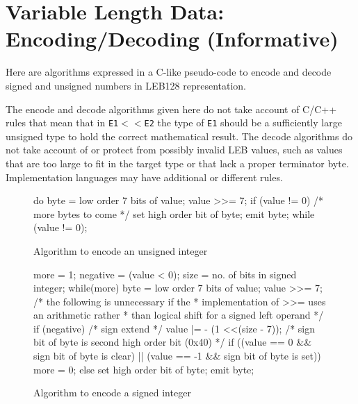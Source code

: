 
\chapter[Encoding/Decoding (Informative)]{Variable Length Data: Encoding/Decoding (Informative)}
\label{app:variablelengthdataencodingdecodinginformative}

Here are algorithms expressed in a C-like pseudo-code to
encode and decode signed and unsigned numbers in LEB128
representation.

The encode and decode algorithms given here do not take account of C/C++ rules
that mean that in \texttt{E1}$ << $\texttt{E2} the type of \texttt{E1} should be
a sufficiently large unsigned type to hold the correct mathematical result.
The decode algorithms do not take account of
or protect from possibly invalid LEB values, such as values
that are too large to fit in the target type or that
lack a proper terminator byte.
Implementation languages may have additional or different rules.

\vspace{2cm}

\begin{figure}[hb]
\begin{nlnlisting}
do
{
    byte = low order 7 bits of value;
    value >>= 7;
    if (value != 0)     /* more bytes to come */
        set high order bit of byte;
    emit byte;
} while (value != 0);
\end{nlnlisting}
\caption{Algorithm to encode an unsigned integer}
\end{figure}

\begin{figure}[ht]
\begin{nlnlisting}
more = 1;
negative = (value < 0);
size = no. of bits in signed integer;
while(more)
{
    byte = low order 7 bits of value;
    value >>= 7;
    /* the following is unnecessary if the
     * implementation of >>= uses an arithmetic rather
     * than logical shift for a signed left operand
     */
    if (negative)
        /* sign extend */
        value |= - (1 <<(size - 7));
    /* sign bit of byte is second high order bit (0x40) */
    if ((value == 0 && sign bit of byte is clear) ||
        (value == -1 && sign bit of byte is set))
        more = 0;
    else
        set high order bit of byte;
    emit byte;
}
\end{nlnlisting}
\caption{Algorithm to encode a signed integer}
\end{figure}

